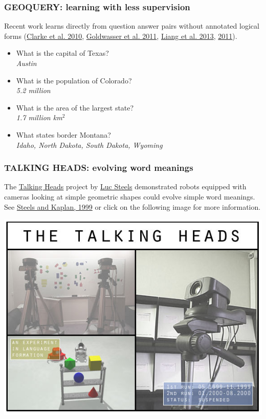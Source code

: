 \documentclass[ignorenonframetext]{beamer}
\begin{document}
\begin{frame}\frametitle{GEOQUERY: learning with less supervision}
Recent work learns directly from question answer pairs without annotated logical forms
(\href{http://aclweb.org/anthology/W/W10/W10-2903.pdf}{Clarke et al. 2010},
\href{http://www.newdesign.aclweb.org/anthology-new/P/P11/P11-1149.pdf}{Goldwasser et al. 2011},
\href{http://aclweb.org/anthology/J/J13/J13-2005.pdf}{Liang et al. 2013},
\href{http://aclweb.org/anthology//P/P11/P11-1060.pdf}{2011}).

\begin{itemize}
\item What is the capital of Texas?
\\ {\sl Austin}
\item What is the population of Colorado?
\\ {\sl 5.2 million}
\item What is the area of the largest state?
\\ {\sl 1.7 million km$^2$}
\item What states border Montana?
\\ {\sl Idaho, North Dakota, South Dakota, Wyoming}
\end{itemize}
\end{frame}

\begin{frame}\frametitle{TALKING HEADS: evolving word meanings}
The
\href{https://web.archive.org/web/20080430230359/http://talking-heads.csl.sony.fr/index.html}{Talking
  Heads} project by \href{http://ai.vub.ac.be/members/steels}{Luc
  Steels} demonstrated robots equipped with cameras looking at simple
geometric shapes could evolve simple word meanings.  See
\href{http://www.researchgate.net/publication/2493098_Bootstrapping_Grounded_Word_Semantics/file/9c9605159e2db023fc.pdf}{Steels
  and Kaplan, 1999} or click on the following image for more
information.
\vspace{1em}
\begin{center}
\href{https://web.archive.org/web/20080430230359/http://talking-heads.csl.sony.fr/index.html}{
\includegraphics[width=.5\textwidth]{images/steels-talking-heads.png}
}
\end{center}
\end{frame}
\end{document}
